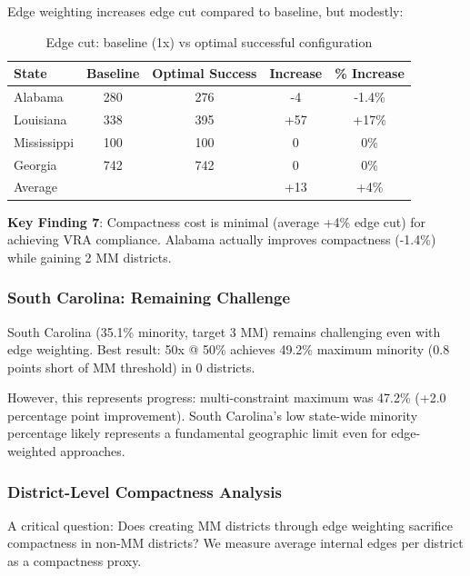 Edge weighting increases edge cut compared to baseline, but modestly:

\begin{table}[h]
\centering
\begin{tabular}{lcccc}
\toprule
State & Baseline & Optimal Success & Increase & \% Increase \\
\midrule
Alabama & 280 & 276 & -4 & -1.4\% \\
Louisiana & 338 & 395 & +57 & +17\% \\
Mississippi & 100 & 100 & 0 & 0\% \\
Georgia & 742 & 742 & 0 & 0\% \\
\midrule
Average & & & +13 & +4\% \\
\bottomrule
\end{tabular}
\caption{Edge cut: baseline (1x) vs optimal successful configuration}
\label{tab:compactness_tradeoff}
\end{table}

\textbf{Key Finding 7}: Compactness cost is minimal (average +4\% edge cut) for achieving VRA compliance. Alabama actually improves compactness (-1.4\%) while gaining 2 MM districts.

\subsubsection{South Carolina: Remaining Challenge}

South Carolina (35.1\% minority, target 3 MM) remains challenging even with edge weighting. Best result: 50x @ 50\% achieves 49.2\% maximum minority (0.8 points short of MM threshold) in 0 districts.

However, this represents progress: multi-constraint maximum was 47.2\% (+2.0 percentage point improvement). South Carolina's low state-wide minority percentage likely represents a fundamental geographic limit even for edge-weighted approaches.

\subsubsection{District-Level Compactness Analysis}

A critical question: Does creating MM districts through edge weighting sacrifice compactness in non-MM districts? We measure average internal edges per district as a compactness proxy.

